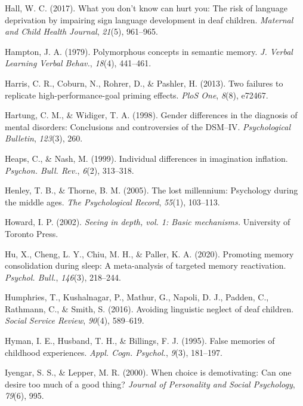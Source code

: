 \documentclass[
]{krantz}
\newlength{\cslhangindent}
\newenvironment{CSLReferences}[2] %
 {\begin{list}{}{%
  \setlength{\itemindent}{0pt}
  \setlength{\leftmargin}{0pt}
  \setlength{\parsep}{0pt}
  \ifodd #1
   \setlength{\leftmargin}{\cslhangindent}
   \setlength{\itemindent}{-1\cslhangindent}
  \fi
  \setlength{\itemsep}{#2\baselineskip}}}
 {\end{list}}
\begin{document}
\begin{CSLReferences}{1}{0}
Hall, W. C. (2017). What you don't know can hurt you: The risk of language deprivation by impairing sign language development in deaf children. \emph{Maternal and Child Health Journal}, \emph{21}(5), 961--965.

Hampton, J. A. (1979). Polymorphous concepts in semantic memory. \emph{J. Verbal Learning Verbal Behav.}, \emph{18}(4), 441--461.

Harris, C. R., Coburn, N., Rohrer, D., \& Pashler, H. (2013). Two failures to replicate high-performance-goal priming effects. \emph{PloS One}, \emph{8}(8), e72467.

Hartung, C. M., \& Widiger, T. A. (1998). Gender differences in the diagnosis of mental disorders: Conclusions and controversies of the DSM--IV. \emph{Psychological Bulletin}, \emph{123}(3), 260.

Heaps, C., \& Nash, M. (1999). Individual differences in imagination inflation. \emph{Psychon. Bull. Rev.}, \emph{6}(2), 313--318.

Henley, T. B., \& Thorne, B. M. (2005). The lost millennium: Psychology during the middle ages. \emph{The Psychological Record}, \emph{55}(1), 103--113.

Howard, I. P. (2002). \emph{Seeing in depth, vol. 1: Basic mechanisms.} University of Toronto Press.

Hu, X., Cheng, L. Y., Chiu, M. H., \& Paller, K. A. (2020). Promoting memory consolidation during sleep: A meta-analysis of targeted memory reactivation. \emph{Psychol. Bull.}, \emph{146}(3), 218--244.

Humphries, T., Kushalnagar, P., Mathur, G., Napoli, D. J., Padden, C., Rathmann, C., \& Smith, S. (2016). Avoiding linguistic neglect of deaf children. \emph{Social Service Review}, \emph{90}(4), 589--619.

Hyman, I. E., Husband, T. H., \& Billings, F. J. (1995). False memories of childhood experiences. \emph{Appl. Cogn. Psychol.}, \emph{9}(3), 181--197.

Iyengar, S. S., \& Lepper, M. R. (2000). When choice is demotivating: Can one desire too much of a good thing? \emph{Journal of Personality and Social Psychology}, \emph{79}(6), 995.


\end{CSLReferences}
\end{document}
